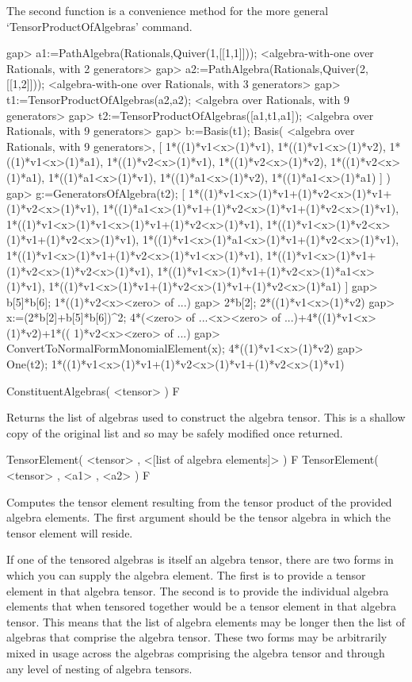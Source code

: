 The second function is a convenience method for the more general `TensorProductOfAlgebras' command.

\beginexample
gap> a1:=PathAlgebra(Rationals,Quiver(1,[[1,1]]));
<algebra-with-one over Rationals, with 2 generators>
gap> a2:=PathAlgebra(Rationals,Quiver(2,[[1,2]]));
<algebra-with-one over Rationals, with 3 generators>
gap> t1:=TensorProductOfAlgebras(a2,a2);
<algebra over Rationals, with 9 generators>
gap> t2:=TensorProductOfAlgebras([a1,t1,a1]);
<algebra over Rationals, with 9 generators>
gap> b:=Basis(t1);
Basis( <algebra over Rationals, with 9 generators>,
[ 1*((1)*v1<x>(1)*v1), 1*((1)*v1<x>(1)*v2), 1*((1)*v1<x>(1)*a1),
  1*((1)*v2<x>(1)*v1), 1*((1)*v2<x>(1)*v2), 1*((1)*v2<x>(1)*a1),
  1*((1)*a1<x>(1)*v1), 1*((1)*a1<x>(1)*v2), 1*((1)*a1<x>(1)*a1) ] )
gap> g:=GeneratorsOfAlgebra(t2);
[ 1*((1)*v1<x>(1)*v1+(1)*v2<x>(1)*v1+(1)*v2<x>(1)*v1),
  1*((1)*a1<x>(1)*v1+(1)*v2<x>(1)*v1+(1)*v2<x>(1)*v1),
  1*((1)*v1<x>(1)*v1<x>(1)*v1+(1)*v2<x>(1)*v1),
  1*((1)*v1<x>(1)*v2<x>(1)*v1+(1)*v2<x>(1)*v1),
  1*((1)*v1<x>(1)*a1<x>(1)*v1+(1)*v2<x>(1)*v1),
  1*((1)*v1<x>(1)*v1+(1)*v2<x>(1)*v1<x>(1)*v1),
  1*((1)*v1<x>(1)*v1+(1)*v2<x>(1)*v2<x>(1)*v1),
  1*((1)*v1<x>(1)*v1+(1)*v2<x>(1)*a1<x>(1)*v1),
  1*((1)*v1<x>(1)*v1+(1)*v2<x>(1)*v1+(1)*v2<x>(1)*a1) ]
gap> b[5]*b[6];
1*((1)*v2<x><zero> of ...)
gap> 2*b[2];
2*((1)*v1<x>(1)*v2)
gap> x:=(2*b[2]+b[5]*b[6])^2;
4*(<zero> of ...<x><zero> of ...)+4*((1)*v1<x>(1)*v2)+1*((
1)*v2<x><zero> of ...)
gap> ConvertToNormalFormMonomialElement(x);
4*((1)*v1<x>(1)*v2)
gap> One(t2);
1*((1)*v1<x>(1)*v1+(1)*v2<x>(1)*v1+(1)*v2<x>(1)*v1)
\endexample

\>ConstituentAlgebras( <tensor> ) F

Returns the list of algebras used to construct the algebra tensor.
This is a shallow copy of the original list and so may be safely modified once returned.


\>TensorElement( <tensor> , <[list of algebra elements]> ) F
\>TensorElement( <tensor> , <a1> , <a2> ) F

Computes the tensor element resulting from the tensor product of the provided algebra elements.
The first argument should be the tensor algebra in which the tensor element will reside.

If one of the tensored algebras is itself an algebra tensor, there are two forms in which you can supply the algebra element.
The first is to provide a tensor element in that algebra tensor.
The second is to provide the individual algebra elements that when tensored together would be a tensor element in that algebra tensor.
This means that the list of algebra elements may be longer then the list of algebras that comprise the algebra tensor.
These two forms may be arbitrarily mixed in usage across the algebras comprising the algebra tensor and through any level of nesting of algebra tensors.

